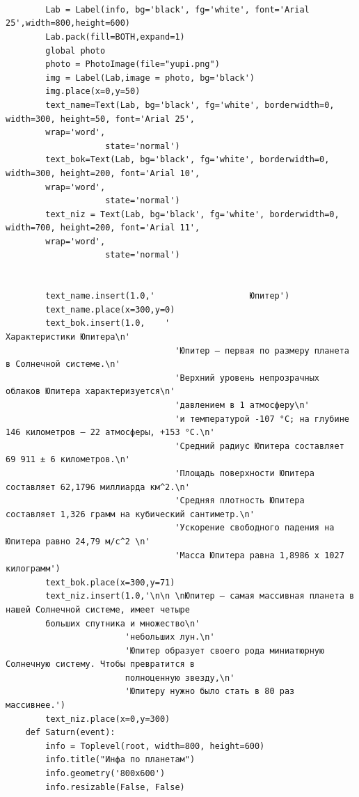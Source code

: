 \documentclass[11pt,a4paper]{report}
\begin{document}
\begin{verbatim}
        
        
    
        Lab = Label(info, bg='black', fg='white', font='Arial 25',width=800,height=600)
        Lab.pack(fill=BOTH,expand=1)
        global photo
        photo = PhotoImage(file="yupi.png")
        img = Label(Lab,image = photo, bg='black')
        img.place(x=0,y=50)
        text_name=Text(Lab, bg='black', fg='white', borderwidth=0, width=300, height=50, font='Arial 25', 
        wrap='word',
                    state='normal')  
        text_bok=Text(Lab, bg='black', fg='white', borderwidth=0, width=300, height=200, font='Arial 10', 
        wrap='word',
                    state='normal')  
        text_niz = Text(Lab, bg='black', fg='white', borderwidth=0, width=700, height=200, font='Arial 11', 
        wrap='word',
                    state='normal')  
    
       
        text_name.insert(1.0,'                   Юпитер')
        text_name.place(x=300,y=0)
        text_bok.insert(1.0,    '                                           Характеристики Юпитера\n' 
                                  'Юпитер – первая по размеру планета в Солнечной системе.\n'
                                  'Верхний уровень непрозрачных облаков Юпитера характеризуется\n'
                                  'давлением в 1 атмосферу\n'
                                  'и температурой -107 °C; на глубине 146 километров – 22 атмосферы, +153 °C.\n'
                                  'Средний радиус Юпитера составляет 69 911 ± 6 километров.\n'
                                  'Площадь поверхности Юпитера составляет 62,1796 миллиарда км^2.\n'
                                  'Средняя плотность Юпитера составляет 1,326 грамм на кубический сантиметр.\n'
                                  'Ускорение свободного падения на Юпитера равно 24,79 м/c^2 \n'
                                  'Масса Юпитера равна 1,8986 х 1027 килограмм')
        text_bok.place(x=300,y=71)        
        text_niz.insert(1.0,'\n\n \nЮпитер — самая массивная планета в нашей Солнечной системе, имеет четыре 
        больших спутника и множество\n'
                        'небольших лун.\n'
                        'Юпитер образует своего рода миниатюрную Солнечную систему. Чтобы превратится в 
                        полноценную звезду,\n'
                        'Юпитеру нужно было стать в 80 раз массивнее.')
        text_niz.place(x=0,y=300)
    def Saturn(event): 
        info = Toplevel(root, width=800, height=600)
        info.title("Инфа по планетам")
        info.geometry('800x600')
        info.resizable(False, False) 
        

\end{verbatim}
\end{document}
